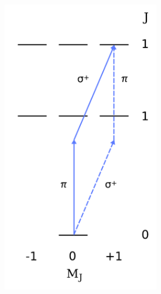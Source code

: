 \documentclass[12pt]{mitthesis}
\begin{document}
\begin{figure}
  \includegraphics[width=2.7in]{hg-forbidden-perppol.pdf}
\end{figure}






\end{document}
